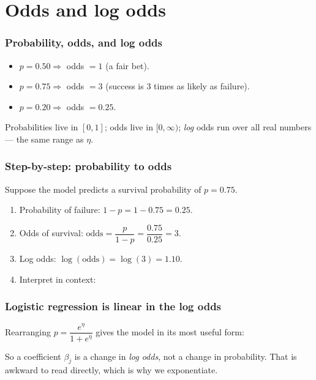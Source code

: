 \documentclass[slidestop,compress,mathserif]{beamer}
\begin{document}
\section{Odds and log odds}
\begin{frame}
\frametitle{Probability, odds, and log odds}


\begin{itemize}
\item $p=0.50 \Rightarrow$ odds $=1$ (a fair bet).
\item $p=0.75 \Rightarrow$ odds $=3$ (success is 3 times as likely as failure).
\item $p=0.20 \Rightarrow$ odds $=0.25$.
\end{itemize}

Probabilities live in $[0,1]$; odds live in $[0,\infty)$; \emph{log} odds run over all real numbers --- the same range as $\eta$.

\end{frame}
\begin{frame}
\frametitle{Step-by-step: probability to odds}

Suppose the model predicts a survival probability of $p=0.75$.

\begin{enumerate}
\item Probability of failure: \; $1-p=1-0.75=0.25$.
\pause
\item Odds of survival: \; $\text{odds}=\dfrac{p}{1-p}=\dfrac{0.75}{0.25}=3$.
\pause
\item Log odds: \; $\log(\text{odds})=\log(3)=1.10$.
\pause
\item Interpret in context:
\end{enumerate}

\pause
\vspace{-0.3em}

\end{frame}
\begin{frame}
\frametitle{Logistic regression is linear in the log odds}

Rearranging $p=\dfrac{e^{\eta}}{1+e^{\eta}}$ gives the model in its most useful form:


So a coefficient $\beta_j$ is a change in \emph{log odds}, not a change in probability. That is awkward to read directly, which is why we exponentiate.

\end{frame}
\end{document}
